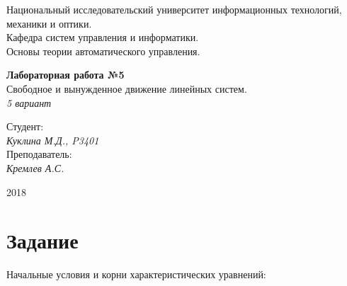 \documentclass[12pt, a4paper] {ncc}
\begin{document}
\setcounter{figure}{0}
\frenchspacing
\pagestyle{empty}
\begin{center}
     Национальный исследовательский университет информационных технологий,
                              механики и оптики.\\
                       Кафедра систем управления и информатики.\\
                  Основы теории автоматического управления.
\end{center}
\begin{center}
                         {\bf Лабораторная работа №5}\\
                Свободное и вынужденное движение линейных систем.\\
                                {\sl 5 вариант}
\end{center}
\begin{flushright}
                                    Студент:\\
                                    {\it Куклина М.Д., P3401}\\
                                    Преподаватель: \\
                                    {\it Кремлев А.С.}
\end{flushright}
\begin{center}
                                      2018
\end{center}
\newpage
\pagestyle{plain}

\section{Задание}

Начальные условия и корни характеристических уравнений:
\end{document}
